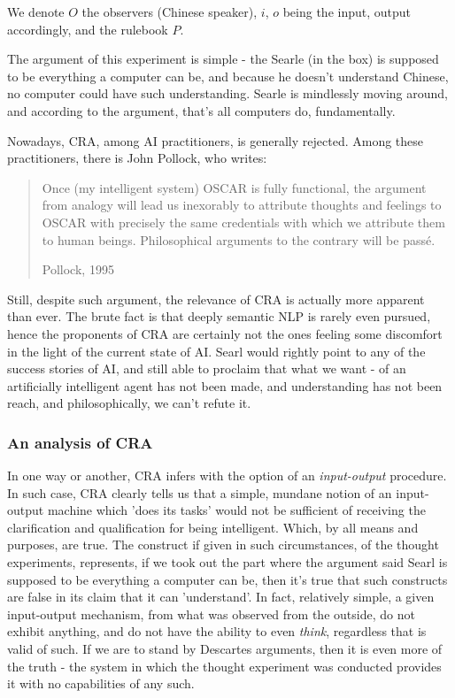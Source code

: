 We denote $O$ the observers (Chinese speaker), $i$, $o$ being the input, output accordingly, and the rulebook $P$.

The argument of this experiment is simple - the Searle (in the box) is supposed to be everything a computer can be, and because he doesn't understand Chinese, no computer could have such understanding. Searle is mindlessly moving around, and according to the argument, that's all computers do, fundamentally.

Nowadays, CRA, among AI practitioners, is generally rejected. Among these practitioners, there is John Pollock, who writes:

\blockquote[Pollock, 1995]{Once (my intelligent system) OSCAR is fully functional, the argument from analogy will lead us inexorably to attribute thoughts and feelings to OSCAR with precisely the same credentials with which we attribute them to human beings. Philosophical arguments to the contrary will be passé.}

Still, despite such argument, the relevance of CRA is actually more apparent than ever. The brute fact is that deeply semantic NLP is rarely even pursued, hence the proponents of CRA are certainly not the ones feeling some discomfort in the light of the current state of AI. Searl would rightly point to any of the success stories of AI, and still able to proclaim that what we want - of an artificially intelligent agent has not been made, and understanding has not been reach, and philosophically, we can't refute it. 
\subsubsection{An analysis of CRA}
In one way or another, CRA infers with the option of an \textit{input-output} procedure. In such case, CRA clearly tells us that a simple, mundane notion of an input-output machine which 'does its tasks' would not be sufficient of receiving the clarification and qualification for being intelligent. Which, by all means and purposes, are true. The construct if given in such circumstances, of the thought experiments, represents, if we took out the part where the argument said Searl is supposed to be everything a computer can be, then it's true that such constructs are false in its claim that it can 'understand'. In fact, relatively simple, a given input-output mechanism, from what was observed from the outside, do not exhibit anything, and do not have the ability to even \textit{think}, regardless that is valid of such. If we are to stand by Descartes arguments, then it is even more of the truth - the system in which the thought experiment was conducted provides it with no capabilities of any such.

